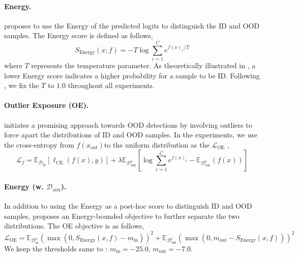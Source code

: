 \documentclass{article}
\theoremstyle{plain}
\theoremstyle{definition}
\theoremstyle{remark}
\begin{document}
\paragraph{Energy.} \citep{liu2020energy} proposes to use the Energy of the predicted logits to distinguish the ID and OOD samples. The Energy score is defined as follows,
\begin{equation}
    S_\text{Energy}(x; f) = -T  \log \sum \limits_{c = 1}^C e^{f(x)_c / T}
\end{equation}
where $T$ represents the temperature parameter. As theoretically illustrated in \citet{liu2020energy}, a lower Energy score indicates a higher probability for a sample to be ID. Following \citep{liu2020energy}, we fix the $T$ to $1.0$ throughout all experiments.

\paragraph{Outlier Exposure (OE).} \citep{hendrycks2018deep} initiates a promising approach towards OOD detections by involving outliers to force apart the distributions of ID and OOD samples. In the experiments, we use the cross-entropy from $f(x_{\text{out}})$to the uniform distribution as the $\mathcal{L}_{\text{OE}}$ \citep{LeeLLS18},
\begin{equation}
\label{eq:oe_app}
    \mathcal{L}_f = \mathbb{E}_{\mathcal{D}_\text{in}}\left[\ell_\text{CE}(f(x),y)\right] + \lambda\mathbb{E}_{\mathcal{D}^\text{s}_\text{out}}\left[\log \sum \limits_{c = 1}^C e^{f(x)_c} - \mathbb{E}_{\mathcal{D}^\text{s}_\text{out}}(f(x))\right]
\end{equation}  

\paragraph{Energy (w. $\mathcal{D}_{\text{aux}}$).} In addition to using the Energy as a post-hoc score to distinguish ID and OOD samples, \citep{liu2020energy} proposes an Energy-bounded objective to further separate the two distributions. The OE objective is as follows,
\begin{equation}
\label{eq:energy_aux}
    \mathcal{L}_{\text{OE}} = \mathbb{E}_{\mathcal{D}^\text{s}_\text{in}}(\max(0, S_\text{Energy}(x,f) - m_\text{in}))^2 + \mathbb{E}_{\mathcal{D}^\text{s}_\text{out}}(\max(0, m_\text{out} - S_\text{Energy}(x,f)))^2
\end{equation}
We keep the thresholds same to \citep{liu2020energy}: $m_\text{in} = -25.0$, $m_\text{out} = -7.0$.
\end{document}
